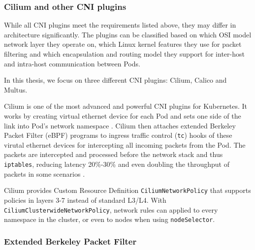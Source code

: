 \documentclass[english,12pt,a4paper,pdftex,sci,utf8]{aaltothesis}
\begin{document}
\subsubsection{Cilium and other CNI plugins}




While all CNI plugins meet the requirements listed above, they may differ in architecture significantly. The plugins can be classified based on which OSI model network layer they operate on, which Linux kernel features they use for packet filtering and which encapsulation and routing model they support for inter-host and intra-host communication between Pods.

In this thesis, we focus on three different CNI plugins: Cilium, Calico and Multus.

Cilium \cite{cilium} is one of the most advanced and powerful CNI plugins for Kubernetes. It works by creating virtual ethernet device for each Pod and sets one side of the link into Pod's network namespace \cite{cilium-tkng}. Cilium then attaches extended Berkeley Packet Filter (eBPF) programs to ingress traffic control (\texttt{tc}) hooks of these virutal ethernet devices for intercepting all incoming packets from the Pod. The packets are intercepted and processed before the network stack and thus \texttt{iptables}, reducing latency 20\%-30\% and even doubling the throughput of packets in some scenarios \cite{budigiri2021network}.

Cilium provides Custom Resource Definition \texttt{CiliumNetworkPolicy} that supports policies in layers 3-7 instead of standard L3/L4. With \texttt{CiliumClusterwideNetworkPolicy}, network rules can applied to every namespace in the cluster, or even to nodes when using \texttt{nodeSelector}.



\subsubsection{Extended Berkeley Packet Filter}
\end{document}
